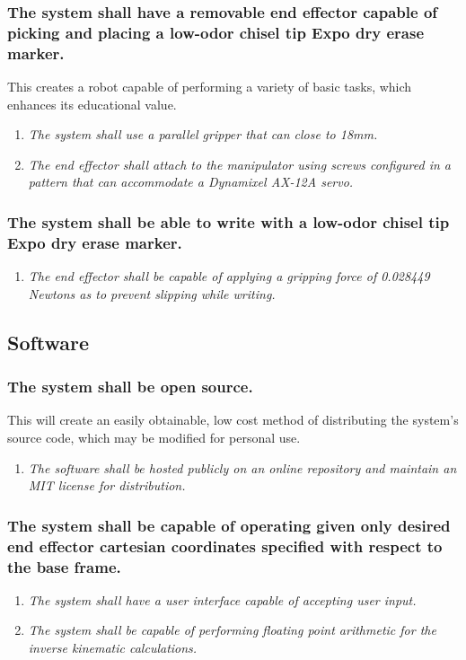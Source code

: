 \documentclass[12pt]{report}
\begin{document}
\subsubsection{The system shall have a removable end effector capable of picking and placing a low-odor chisel tip Expo dry erase marker.}
This creates a robot capable of performing a variety of basic tasks, which enhances its educational value.
\begin{enumerate}[label=\thesubsubsection.\alph*,leftmargin=3cm,font=\itshape]
  \item \textit{The system shall use a parallel gripper that can close to 18mm.}
  \item \textit{The end effector shall attach to the manipulator using screws configured in a pattern that can accommodate a Dynamixel AX-12A servo.}
\end{enumerate}

\subsubsection{The system shall be able to write with a low-odor chisel tip Expo dry erase marker.}
\begin{enumerate}[label=\thesubsubsection.\alph*,leftmargin=3cm,font=\itshape]
  \item \textit{The end effector shall be capable of applying a gripping force of 0.028449 Newtons as to prevent slipping while writing.}
\end{enumerate}

\subsection{Software}
\subsubsection{The system shall be open source.}
This will create an easily obtainable, low cost method of distributing the system’s source code, which may be modified for personal use.
\begin{enumerate}[label=\thesubsubsection.\alph*,leftmargin=3cm,font=\itshape]
  \item \textit{The software shall be hosted publicly on an online repository and maintain an MIT license for distribution.}
\end{enumerate}
\subsubsection{The system shall be capable of operating given only desired end effector cartesian coordinates specified with respect to the base frame.}
\begin{enumerate}[label=\thesubsubsection.\alph*,leftmargin=3cm,font=\itshape]
  \item \textit{The system shall have a user interface capable of accepting user input.}
  \item \textit{The system shall be capable of performing floating point arithmetic for the inverse kinematic calculations.}
\end{enumerate}
\end{document}
